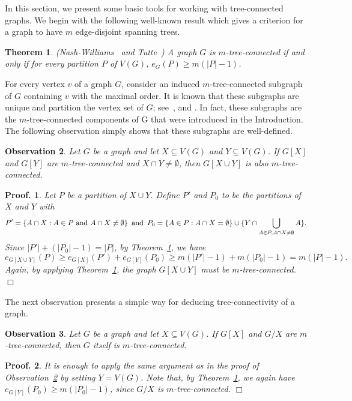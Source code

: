 \documentclass[10pt,bezier]{article}
\newtheorem{prethm}{{\bf Theorem}}[section]
\newenvironment{thm}{\begin{prethm}{\hspace{-0.5
em}{\bf.}}}{\end{prethm}}
\newtheorem{preobserv}[prethm]{{\bf Observation}}
\newenvironment{observ}{\begin{preobserv}{\hspace{-0.5
em}{\bf.}}}{\end{preobserv}}
\newtheorem{preproof}{{\bf Proof.}}
\newenvironment{proof}[1]{\begin{preproof}{\rm
#1}\hfill{$\Box$}}{\end{preproof}}
\begin{document}
In this section, 
we present some basic tools for working 
with tree-connected graphs.
We begin 
with the following well-known result which gives
a criterion for a graph to have 
$m$ edge-disjoint spanning trees.
%
\begin{thm}{\rm (Nash-Williams~\cite{Nash-Williams-1961} and Tutte~\cite{Tutte-1961})}
\label{thm:Nash-Williams,Tutte}
{A graph $G$ is $m$-tree-connected if and only if for every partition $P$ of $V(G)$, $e_G(P)\ge m(|P|-1)$.
}\end{thm}
%
For every vertex $v$ of a graph $G$, consider an induced $m$-tree-connected subgraph of $G$ containing $v$ with the maximal order.
It is known that these subgraphs are unique and partition the vertex set of $G$; 
see~\cite{Catlin-1989}, and \cite[Lemma 4.7]{Shu-Zhang-Zhang-2012}.
%
In fact, these subgraphs are the $m$-tree-connected components of G that were introduced in the
Introduction. The following observation simply shows that these subgraphs are well-defined. 
%
\begin{observ}\label{observ:definition:tree-connected}
{Let $G$ be a graph and let $X\subseteq V(G)$ and $Y\subseteq V(G)$. If $G[X]$ and $G[Y]$ are $m$-tree-connected
 and $X\cap Y\neq \emptyset$, then $G[X\cup Y]$ is also $m$-tree-connected.
}\end{observ}
\begin{proof}
{Let $P$ be a partition of $X\cup Y$. 
Define $P'$ and $P_0$ to be the partitions of $X$ and $Y$ with 
$$P'=\{A\cap X: A\in P \text{ and } A\cap X\neq \emptyset \} \text{\, and\, } 
P_0=\{ A\in P: A\cap X= \emptyset\} \cup 
\{Y\cap \bigcup_{A\in P, A\cap X\neq \emptyset}A\}.$$
Since $ |P'|+(|P_0|-1)= |P|$, by Theorem~\ref{thm:Nash-Williams,Tutte}, 
we have 
$$e_{G[X\cup Y]}(P)\ge e_{G[X]}(P')+e_{G[Y]}(P_0)\ge m(|P'|-1)+m(|P_0|-1)= m(|P|-1).$$
Again, by applying Theorem~\ref{thm:Nash-Williams,Tutte}, the graph $G[X\cup Y]$ must be $m$-tree-connected.
}\end{proof}
%
%
The next observation presents a simple way for deducing tree-connectivity of a graph.
%
\begin{observ}\label{observ:deducing}
{Let $G$ be a graph and let $X\subseteq V(G)$. 
If $G[X]$ and $G/X$ are $m$-tree-connected, then $G$ itself is $m$-tree-connected.
}\end{observ}
\begin{proof}
{It is enough to apply the same argument as in the proof of Observation~\ref{observ:definition:tree-connected} by setting $Y=V(G)$.
Note that, by Theorem~\ref{thm:Nash-Williams,Tutte}, we again have $e_{G[Y]}(P_0)\ge m(|P_0|-1)$, since $G/X$ is $m$-tree-connected.
}\end{proof}
%
%
%
%
%
\end{document}
